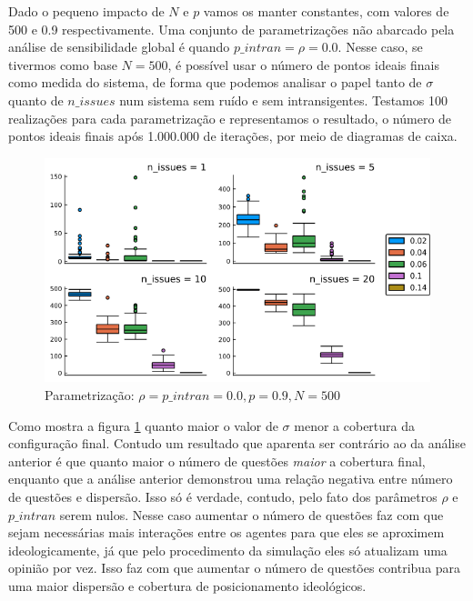     Dado o pequeno impacto de \(N\) e \(p\) vamos os manter constantes, com
    valores de 500 e 0.9 respectivamente. Uma conjunto de parametrizações não
    abarcado pela análise de sensibilidade global é quando \(p\_intran = \rho  =
    0.0\). Nesse caso, se tivermos como base \(N = 500\), é possível usar o
    número de pontos ideais finais como medida do sistema, de forma que podemos
    analisar o papel tanto de \(\sigma\) quanto de \(n\_issues\) num sistema sem
    ruído e sem intransigentes. Testamos 100 realizações para cada
    parametrização e representamos o resultado, o número de pontos ideais finais
    após 1.000.000 de iterações, por meio de diagramas de caixa.
    
  \begin{figure}[H]
    \centering
    \includegraphics[scale=0.7]{ims/boxes4.png}
    \caption{Parametrização: \(\rho = p\_intran = 0.0, p = 0.9, N =500\)}
    \label{fig:box4}
  \end{figure}
  
  Como mostra a figura \ref{fig:box4} quanto maior o valor de \(\sigma\) menor a
  cobertura da configuração final. Contudo um resultado que aparenta ser
  contrário ao da análise anterior é que quanto maior o número de questões
  \textit{maior} a cobertura final, enquanto que a análise anterior demonstrou
  uma relação negativa entre número de questões e dispersão. Isso só é verdade,
  contudo, pelo fato dos parâmetros \(\rho\) e \(p\_intran\) serem nulos. Nesse
  caso aumentar o número de questões faz com que sejam necessárias mais
  interações entre os agentes para que eles se aproximem ideologicamente, já que
  pelo procedimento da simulação eles só atualizam uma opinião por vez. Isso faz
  com que aumentar o número de questões contribua para uma maior dispersão e
  cobertura de posicionamento ideológicos.

